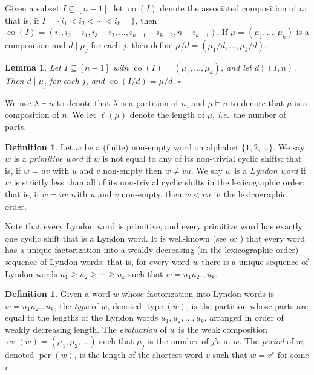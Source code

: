 \documentclass[12pt]{article}
\DeclareMathOperator{\type}{type}
\DeclareMathOperator{\per}{per}
\DeclareMathOperator{\ev}{ev}
\DeclareMathOperator{\co}{co}
\newtheorem{lem}[thm]{Lemma}
\theoremstyle{definition}
\newtheorem{defn}[thm]{Definition}
\begin{document}
Given a subset $I \subseteq [n-1]$, let $\co(I)$ denote the associated composition of $n$; that is, if $I = \{i_1 < i_2 < \cdots < i_{k-1}\}$, then $\co(I) = (i_1, i_2 - i_1, i_3 - i_2, \ldots, i_{k-1} - i_{k-2}, n - i_{k-1})$. If $\mu = (\mu_1, \ldots, \mu_k)$ is a composition and $d \mid \mu_j$ for each $j$, then define $\mu/d = (\mu_1/d, \ldots, \mu_k/d)$.

\begin{lem} \label{sillylemma} Let $I \subseteq [n-1]$ with $\co(I) = (\mu_1, \ldots, \mu_k)$, and let $d \mid (I,n)$. Then $d \mid \mu_j$ for each $j$, and $\co(I/d) = \mu/d$. \hfill $\square$
\end{lem}

We use $\lambda\vdash n$ to denote that $\lambda$ is a partition of $n$, and $\mu\vDash n$ to denote that $\mu$ is a composition of $n$. We let $\ell(\mu)$ denote the length of $\mu$, \textit{i.e.}\ the number of parts.

\begin{defn} \label{lyndon} Let $w$ be a (finite) non-empty word on alphabet $\{1, 2, \ldots\}$. We say $w$ is a \textit{primitive word} if $w$ is not equal to any of its non-trivial cyclic shifts: that is, if $w = uv$ with $u$ and $v$ non-empty then $w \not= vu$. We say $w$ is a \textit{Lyndon word} if $w$ is strictly less than all of its non-trivial cyclic shifts in the lexicographic order: that is, if $w = uv$ with $u$ and $v$ non-empty, then $w < vu$ in the lexicographic order.
\end{defn}

Note that every Lyndon word is primitive, and every primitive word has exactly one cyclic shift that is a Lyndon word. It is well-known (see \cite[Thm.\ 5.1.5]{L} or \cite[Exer.\ 7.89.d]{Stanley2}) that every word has a unique factorization into a weakly decreasing (in the lexicographic order) sequence of Lyndon words: that is, for every word $w$ there is a unique sequence of Lyndon words $u_1 \ge u_2 \ge \cdots \ge u_k$ such that $w = u_1u_2\dots u_k$.

\begin{defn} \label{type} Given a word $w$ whose factorization into Lyndon words is $w = u_1u_2\dots u_k$, the \textit{type} of $w$, denoted $\type(w)$, is the partition whose parts are equal to the lengths of the Lyndon words $u_1, u_2, \ldots, u_k$, arranged in order of weakly decreasing length. The \textit{evaluation} of $w$ is the weak composition $\ev(w) = (\mu_1, \mu_2,\ldots)$ such that $\mu_j$ is the number of $j$'s in $w$. The \textit{period} of $w$, denoted $\per(w)$, is the length of the shortest word $v$ such that $w = v^r$ for some $r$.
\end{defn}
\end{document}
